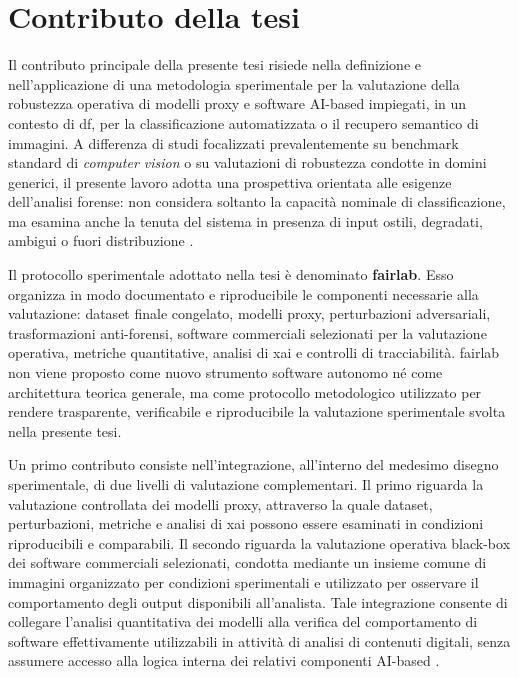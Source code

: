 \section{Contributo della tesi}
Il contributo principale della presente tesi risiede nella definizione e nell'applicazione di una metodologia sperimentale per la valutazione della robustezza operativa di modelli proxy e software AI-based impiegati, in un contesto di \gls{df}, per la classificazione automatizzata o il recupero semantico di immagini. A differenza di studi focalizzati prevalentemente su benchmark standard di \textit{computer vision} o su valutazioni di robustezza condotte in domini generici, il presente lavoro adotta una prospettiva orientata alle esigenze dell'analisi forense: non considera soltanto la capacità nominale di classificazione, ma esamina anche la tenuta del sistema in presenza di input ostili, degradati, ambigui o fuori distribuzione \cite{nowroozi2020phd,hendrycks2019benchmarking,sanna2024preliminary,sanna2025pixelperfect}.

Il protocollo sperimentale adottato nella tesi è denominato \textbf{\gls{fairlab}}. Esso organizza in modo documentato e riproducibile le componenti necessarie alla valutazione: dataset finale congelato, modelli proxy, perturbazioni adversariali, trasformazioni anti-forensi, software commerciali selezionati per la valutazione operativa, metriche quantitative, analisi di \gls{xai} e controlli di tracciabilità. \gls{fairlab} non viene proposto come nuovo strumento software autonomo né come architettura teorica generale, ma come protocollo metodologico utilizzato per rendere trasparente, verificabile e riproducibile la valutazione sperimentale svolta nella presente tesi.

Un primo contributo consiste nell'integrazione, all'interno del medesimo disegno sperimentale, di due livelli di valutazione complementari. Il primo riguarda la valutazione controllata dei modelli proxy, attraverso la quale dataset, perturbazioni, metriche e analisi di \gls{xai} possono essere esaminati in condizioni riproducibili e comparabili. Il secondo riguarda la valutazione operativa black-box dei software commerciali selezionati, condotta mediante un insieme comune di immagini organizzato per condizioni sperimentali e utilizzato per osservare il comportamento degli output disponibili all'analista. Tale integrazione consente di collegare l'analisi quantitativa dei modelli alla verifica del comportamento di software effettivamente utilizzabili in attività di analisi di contenuti digitali, senza assumere accesso alla logica interna dei relativi componenti AI-based \cite{costantini2019digital,sanna2024preliminary,sanna2025pixelperfect}.

